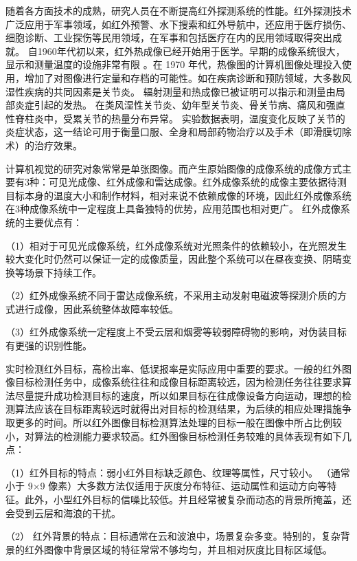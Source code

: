 随着各方面技术的成熟，研究人员在不断提高红外探测系统的性能。红外探测技术广泛应用于军事领域，如红外预警、水下搜索和红外导航中，还应用于医疗损伤、细胞诊断、工业探伤等民用领域，在军事和包括医疗在内的民用领域取得突出成就。
自1960年代初以来，红外热成像已经开始用于医学\cite{ring1975thermography}。早期的成像系统很大，显示和测量温度的设施非常有限
。在 1970 年代，热像图的计算机图像处理投入使用，增加了对图像进行定量和存档的可能性。如在疾病诊断和预防领域，大多数风湿性疾病的共同因素是关节炎。 辐射测量和热成像已被证明可以指示和测量由局部炎症引起的发热。 在类风湿性关节炎、幼年型关节炎、骨关节病、痛风和强直性脊柱炎中，受累关节的热量分布异常。 实验数据表明，温度变化反映了关节的炎症状态，这一结论可用于衡量口服、全身和局部药物治疗以及手术（即滑膜切除术）的治疗效果。

计算机视觉的研究对象常常是单张图像。而产生原始图像的成像系统的成像方式主要有3种：可见光成像、红外成像和雷达成像。红外成像系统的成像主要依据待测目标本身的温度大小和制作材料，相对来说不依赖成像的环境，因此红外成像系统在3种成像系统中一定程度上具备独特的优势，应用范围也相对更广。
红外成像系统的主要优点有：

（1）相对于可见光成像系统，红外成像系统对光照条件的依赖较小，在光照发生较大变化时仍然可以保证一定的成像质量，因此整个系统可以在昼夜变换、阴晴变换等场景下持续工作。

（2）红外成像系统不同于雷达成像系统，不采用主动发射电磁波等探测介质的方式进行成像，因此系统整体故障率较低。

（3）红外成像系统一定程度上不受云层和烟雾等较弱障碍物的影响，对伪装目标有更强的识别性能。

实时检测红外目标，高检出率、低误报率是实际应用中重要的要求。一般的红外图像目标检测任务中，成像系统往往和成像目标距离较远，因为检测任务往往要求算法尽量提升成功检测目标的速度，所以如果目标在往成像设备方向运动，理想的检测算法应该在目标距离较远时就得出对目标的检测结果，为后续的相应处理措施争取更多的时间。所以红外图像目标检测算法处理的目标一般在图像中所占比例较小，对算法的检测能力要求较高。红外图像目标检测任务较难的具体表现有如下几点：

（1）红外目标的特点：弱小红外目标缺乏颜色、纹理等属性，尺寸较小。 （通常小于 9×9 像素）大多数方法仅适用于灰度分布特征、运动属性和运动方向等特征。此外，小型红外目标的信噪比较低。并且经常被复杂而动态的背景所掩盖，还会受到云层和海浪的干扰。

（2） 红外背景的特点：目标通常在云和波浪中，场景复杂多变。特别的，复杂背景的红外图像中背景区域的特征常常不够均匀，并且相对灰度比目标区域低。

